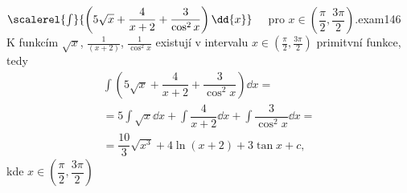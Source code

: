 \begin{mathexam}{\(\scalerel{\int}{\left(5\sqrt{x} + \dfrac{4}{x+2} +
  \dfrac{3}{\cos^2x}\right)\dd{x}} \quad\) pro \(x\in\left(\dfrac{\pi}{2},
  \dfrac{3\pi}{2}\right)\).}{exam146} 
%   
  K funkcím \(\sqrt{x}\), \(\frac{1}{(x+2)}\), \(\frac{1}{\cos^2x}\) existují v intervalu
  \(x\in(\frac{\pi}{2}, \frac{3\pi}{2})\) primitvní funkce, tedy  
  \begin{multline*}
    \int\left(5\sqrt{x} + \dfrac{4}{x+2} + \dfrac{3}{\cos^2x}\right)\dd{x} =       \\
        = 5\int\sqrt{x}\dd{x} + \int\dfrac{4}{x+2}\dd{x} + \int\dfrac{3}{\cos^2x}\dd{x} = \\
        = \dfrac{10}{3}\sqrt{x^3} + 4\ln(x+2) + 3\tan x + c, 
  \end{multline*}
  kde \(x\in\left(\dfrac{\pi}{2}, \dfrac{3\pi}{2}\right)\)
\end{mathexam}